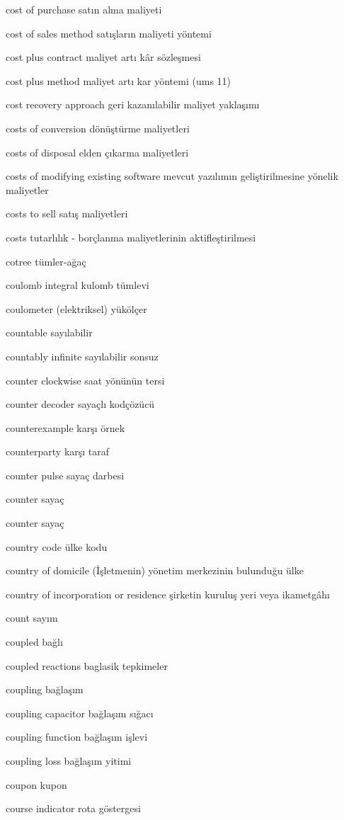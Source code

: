 \documentclass[12pt,fleqn]{article}\usepackage{../../common}
\begin{document}
cost of purchase satın alma maliyeti

cost of sales method satışların maliyeti yöntemi

cost plus contract maliyet artı kâr sözleşmesi

cost plus method maliyet artı kar yöntemi (ums 11)

cost recovery approach geri kazanılabilir maliyet yaklaşımı

costs of conversion dönüştürme maliyetleri

costs of disposal elden çıkarma maliyetleri

costs of modifying existing software mevcut yazılımın geliştirilmesine yönelik maliyetler

costs to sell satış maliyetleri

costs tutarlılık - borçlanma maliyetlerinin aktifleştirilmesi

cotree tümler-ağaç

coulomb integral kulomb tümlevi

coulometer (elektriksel) yükölçer

countable sayılabilir

countably infinite sayılabilir sonsuz

counter clockwise saat yönünün tersi

counter decoder sayaçlı kodçözücü

counterexample karşı örnek

counterparty karşı taraf

counter pulse sayaç darbesi

counter sayaç

counter sayaç

country code ülke kodu

country of domicile (İşletmenin) yönetim merkezinin bulunduğu ülke

country of incorporation or residence şirketin kuruluş yeri veya ikametgâhı

count sayım

coupled bağlı

coupled reactions baglasik tepkimeler

coupling bağlaşım

coupling capacitor bağlaşım sığacı

coupling function bağlaşım işlevi

coupling loss bağlaşım yitimi

coupon kupon

course indicator rota göstergesi
\end{document}
